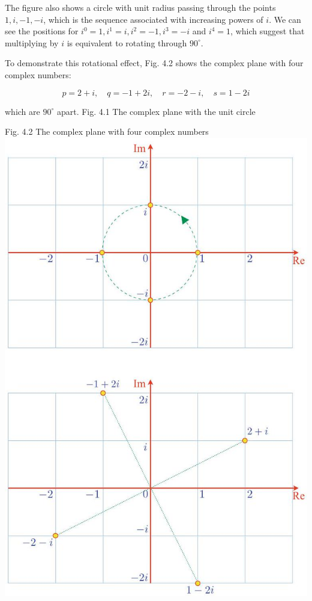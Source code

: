 \documentclass[10pt]{article}
\begin{document}
The figure also shows a circle with unit radius passing through the points $1, i,-1,-i$, which is the sequence associated with increasing powers of $i$. We can see the positions for $i^{0}=1, i^{1}=i, i^{2}=-1, i^{3}=-i$ and $i^{4}=1$, which suggest that multiplying by $i$ is equivalent to rotating through $90^{\circ}$.

To demonstrate this rotational effect, Fig. 4.2 shows the complex plane with four complex numbers:

$$
p=2+i, \quad q=-1+2 i, \quad r=-2-i, \quad s=1-2 i
$$

which are $90^{\circ}$ apart. Fig. 4.1 The complex plane with the unit circle

Fig. 4.2 The complex plane with four complex numbers
\includegraphics[max width=\textwidth, center]{2023_04_20_41f1ceac5a31dc7d1b59g-069}
\end{document}
